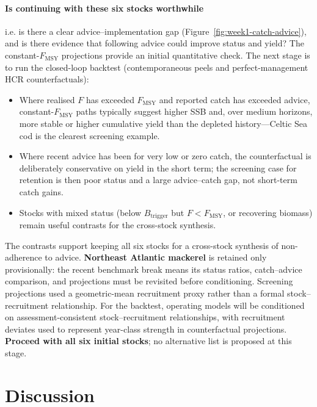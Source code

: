 \documentclass[11pt,a4paper]{extarticle}
\begin{document}
\paragraph{Is continuing with these six stocks worthwhile} i.e. is there a clear advice--implementation gap (Figure~\ref{fig:week1-catch-advice}), and is there evidence that following advice could improve status and yield?
The constant-\(F_{\mathrm{MSY}}\) projections provide an initial quantitative check. The next stage is to run the closed-loop backtest (contemporaneous peels and perfect-management HCR counterfactuals):
\begin{itemize}
  \item Where realised \(F\) has exceeded \(F_{\mathrm{MSY}}\) and reported
        catch has exceeded advice, constant-\(F_{\mathrm{MSY}}\) paths
        typically suggest higher SSB and, over medium horizons, more stable or
        higher cumulative yield than the depleted history---Celtic Sea cod is
        the clearest screening example.
  \item Where recent advice has been for very low or zero catch, the
        counterfactual is deliberately conservative on yield in the short
        term; the screening case for retention is then poor status and a large
        advice--catch gap, not short-term catch gains.
  \item Stocks with mixed status (below \(B_{\mathrm{trigger}}\) but
        \(F < F_{\mathrm{MSY}}\), or recovering biomass) remain useful
        contrasts for the cross-stock synthesis.
\end{itemize}

The contrasts support keeping all six stocks for a cross-stock synthesis of
non-adherence to advice. \textbf{Northeast Atlantic mackerel} is retained only
provisionally: the recent benchmark break means its status ratios, catch--advice
comparison, and projections must be revisited before conditioning. Screening projections used a geometric-mean
recruitment proxy rather than a formal stock--recruitment relationship. For the
backtest, operating models will be conditioned on assessment-consistent
stock--recruitment relationships, with recruitment deviates used to represent
year-class strength in counterfactual projections. \textbf{Proceed with all six
initial stocks}; no alternative list is proposed at this stage.

\section{Discussion}
\label{sec:week1-discussion}
\end{document}
